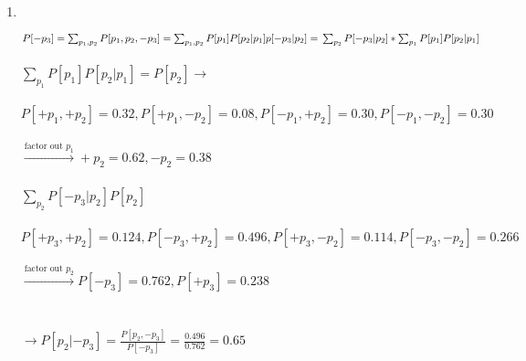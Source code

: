\begin{enumerate}
\begin{latin}
    
    \end{latin}
    \item \phantom{text}
    \\
    \begin{latin}
      $P[-p_3] = \sum_{p_1,p_2}P[p_1,p_2,-p_3] = \sum_{p_1,p_2}P[p_1]P[p_2|p_1]p[-p_3|p_2] = 
      \\\\ \sum_{p_2} P[-p_3|p_2] *\sum_{p_1}P[p_1]P[p_2|p_1] $
      \\\\
      $\sum_{p_1}P[p_1]P[p_2|p_1] = P[p_2] \rightarrow$
      \\\\ 
      $P[+p_1,+p_2] = 0.32 , P[+p_1,-p_2] = 0.08,P[-p_1,+p_2] = 0.30,P[-p_1,-p_2]=0.30$
      \\\\
      $\xrightarrow[]{\text{factor out $p_1$}} +p_2 = 0.62,-p_2=0.38$
      \\\\
      $\sum_{p_2} P[-p_3|p_2]P[p_2]$
      \\\\
      $P[+p_3,+p_2] = 0.124,P[-p_3,+p_2]=0.496,P[+p_3,-p_2]=0.114,P[-p_3,-p_2]=0.266$
      \\\\
      $\xrightarrow[]{\text{factor out $p_2$}} P[-p_3] = 0.762,P[+p_3]=0.238$
      \\\\\\
      $\rightarrow P[p_2|-p_3] = \frac{P[p_2,-p_3]}{P[-p_3]} = \frac{0.496}{0.762} = 0.65$
    \end{latin}
    
  \end{enumerate}





